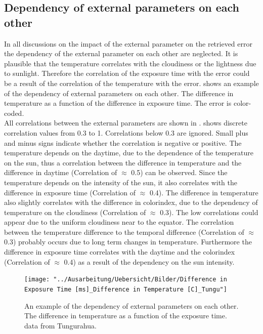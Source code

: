 \documentclass  [
  paper    = a4,
  BCOR     = 10mm,
  twoside,
  fontsize = 12pt,
  fleqn,
  toc      = bibnumbered,
  toc      = listofnumbered,
  numbers  = noendperiod,
  headings = normal,
  listof   = leveldown,
  version  = 3.03
]                                       {scrreprt}
\begin{document}
	\subsection*{Dependency of external parameters on each other}
	In all discussions on the impact of the external parameter on the retrieved   error the  dependency of the external parameter on each other are neglected. It is plausible that the temperature correlates with the cloudiness or the lightness due to sunlight. Therefore the correlation of the exposure time with the   error could be a result of the correlation of the temperature with the   error.  shows an example of the dependency of external parameters on each other. The difference in temperature as a function of the difference in exposure time. The   error is color-coded. \\
	All correlations between the external parameters are shown in .  shows discrete correlation values from 0.3 to 1. Correlations below 0.3 are ignored. Small plus and minus signs indicate whether the correlation is negative or positive. 
	The temperature depends on the daytime, due to the dependence of the temperature on the sun, thus a correlation between the  difference in temperature and the difference in daytime (Correlation of $\approx$ 0.5) can be observed. Since the temperature depends on the intensity of the sun, it also correlates with  the difference in exposure time (Correlation of $\approx$ 0.4). The difference in temperature also slightly correlates with the difference in colorindex, due to the dependency of temperature on the cloudiness (Correlation of $\approx$ 0.3). The low correlations could appear due to the uniform cloudiness near to the equator. The correlation between the temperature difference to the temporal difference (Correlation of $\approx$ 0.3) probably occurs due to long term changes in temperature. Furthermore the difference in exposure time correlates with the daytime and the colorindex (Correlation of $\approx$ 0.4) as a result of the dependency on the sun intensity.\\
	\begin{figure}
		\centering
		\texttt{[image: "../Ausarbeitung/Uebersicht/Bilder/Difference in Exposure Time [ms]\_Difference in Temperature [C]\_Tungu"]}
		\caption{An example of the dependency of external parameters on each other. The difference in temperature as a function of the exposure time. data from Tungurahua.}
		\label{fig:difference-in-exposure-time-msdifference-in-temperature-ctungu}
	\end{figure}
\end{document}
